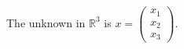 \documentclass[preview]{standalone}
\begin{document}
\begin{center}
The unknown in $\mathbb{R}^3$ is $x = \begin{pmatrix}x_1\\x_2\\x_3\end{pmatrix}.$
\end{center}
\end{document}
